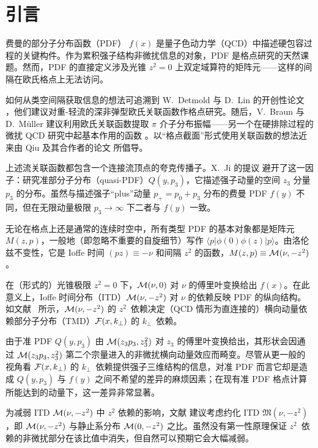\section{引言}

费曼的部分子分布函数（PDF）\cite{Feynman:1973xc} $f(x)$ 是量子色动力学（QCD）中描述硬包容过程的关键构件。作为累积强子结构非微扰信息的对象，PDF 是格点研究的天然课题。然而，PDF 的直接定义涉及光锥 $z^2=0$ 上双定域算符的矩阵元——这样的间隔在欧氏格点上无法访问。

如何从类空间隔获取信息的想法可追溯到 \mbox{W.~Detmold} 与 D.~Lin 的开创性论文 \cite{Detmold:2005gg}，他们建议对重-轻流的深非弹型欧氏关联函数作格点研究。随后，V.~Braun 与 D.~M\"uller \cite{Braun:2007wv} 建议利用欧氏关联函数提取 $\pi$ 介子分布振幅——另一个在硬排除过程的微扰 QCD 研究中起基本作用的函数 \cite{Radyushkin:1977gp}。以``格点截面''形式使用关联函数的想法近来由 Qiu 及其合作者的论文 \cite{Ma:2014jla,Ma:2017pxb} 所倡导。

上述流关联函数都包含一个连接流顶点的夸克传播子。X.~Ji 的提议 \cite{Ji:2013dva} 避开了这一因子：研究准部分子分布（quasi-PDF）$Q(y,p_3)$，它描述强子动量的空间 $z_3$ 分量 $p_3$ 的分布。虽然与描述强子``plus''动量 $p_+=p_0+p_3$ 分布的费曼 PDF $f(y)$ 不同，但在无限动量极限 $p_3\to \infty$ 下二者与 $f(y)$ 一致。

无论在格点上还是通常的连续时空中，所有类型 PDF 的基本对象都是矩阵元 $M(z,p)$，一般地（即忽略不重要的自旋细节）写作 $\langle  p | \phi (0)  \phi(z)  | p \rangle $。由洛伦兹不变性，它是 Ioffe 时间 $(pz)\equiv -\nu$ \cite{Ioffe:1969kf} 和间隔 $z^2$ 的函数，$M(z,p) \equiv {\cal M} (\nu, -z^2)$。

在（形式的）光锥极限 $z^2=0$ 下，${\cal M} (\nu, 0)$ 对 $\nu$ 的傅里叶变换给出 $f(x)$。在此意义上，Ioffe 时间分布（ITD）${\cal M} (\nu, -z^2)$ 对 $\nu$ 的依赖反映 PDF 的纵向结构。如\mbox{文献 \cite{Radyushkin:2016hsy}} 所示，${\cal M} (\nu, -z^2)$ 的 \mbox{$z^2$ 依赖}决定（QCD 情形为直连接的）横向动量依赖部分子分布（TMD）${\cal F} (x, k_\perp)$ 的 \mbox{$k_\perp$ 依赖}。

由于准 PDF $Q(y,p_3)$ 由 ${\cal M} (z_3 p_3, z_3^2)$ 对 $z_3$ 的傅里叶变换给出，其形状会因通过 ${\cal M} (z_3 p_3, z_3^2)$ 第二个宗量进入的非微扰横向动量效应而畸变。尽管从更一般的视角看 ${\cal F} (x, k_\perp)$ 的 \mbox{$k_\perp$ 依赖}提供强子三维结构的信息，对准 PDF 而言它却是造成 $Q(y,p_3)$ 与 $f(y)$ 之间不希望的差异的麻烦因素；在现有准 PDF 格点计算所能达到的动量下，这一差异非常显著。

为减弱 ITD ${\cal M} (\nu, -z^2)$ 中 $z^2$ 依赖的影响，文献 \cite{Radyushkin:2017cyf} 建议考虑约化 ITD ${\mathfrak M} (\nu, -z^2)$，即 ${\cal M} (\nu, -z^2)$ 与静止系分布 ${\cal M} (0, -z^2)$ 之比。虽然没有第一性原理保证 \mbox{$z^2$ 依赖}的非微扰部分在该比值中消失，但自然可以预期它会大幅减弱。

